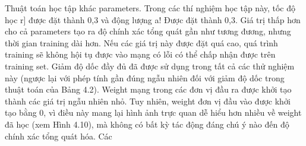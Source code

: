 Thuật toán học tập khác parameters. Trong các thí nghiệm học tập này, tốc độ học r] được đặt thành 0,3 và động lượng a! Được đặt thành 0,3. Giá trị thấp hơn cho cả parameters tạo ra độ chính xác tổng quát gần như tương đương, nhưng thời gian training dài hơn. Nếu các giá trị này được đặt quá cao, quá trình training sẽ không hội tụ được vào mạng có lỗi có thể chấp nhận được trên training set. Giảm độ dốc đầy đủ đã được sử dụng trong tất cả các thử nghiệm này (ngược lại với phép tính gần đúng ngẫu nhiên đối với giảm độ dốc trong thuật toán của Bảng 4.2). Weight mạng trong các đơn vị đầu ra được khởi tạo thành các giá trị ngẫu nhiên nhỏ. Tuy nhiên, weight đơn vị đầu vào được khởi tạo bằng 0, vì điều này mang lại hình ảnh trực quan dễ hiểu hơn nhiều về weight đã học (xem Hình 4.10), mà không có bất kỳ tác động đáng chú ý nào đến độ chính xác tổng quát hóa. Các

